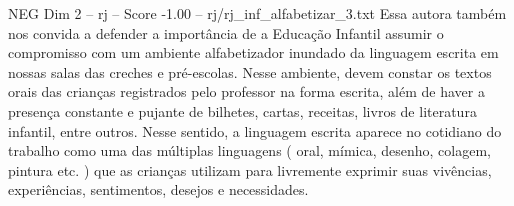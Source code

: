 \begin{textsample}{NEG Dim 2 – rj – Score -1.00 – rj/rj\_inf\_alfabetizar\_3.txt}
Essa autora também nos convida a defender a importância de a Educação Infantil assumir o compromisso com um ambiente alfabetizador inundado da linguagem escrita em nossas salas das creches e pré-escolas.
Nesse ambiente, devem constar os textos orais das crianças registrados pelo professor na forma escrita, além de haver a presença constante e pujante de bilhetes, cartas, receitas, livros de literatura infantil, entre outros.
Nesse sentido, a linguagem escrita aparece no cotidiano do trabalho como uma das múltiplas linguagens ( oral, mímica, desenho, colagem, pintura etc. ) que as crianças utilizam para livremente exprimir suas vivências, experiências, sentimentos, desejos e necessidades.

\end{textsample}
